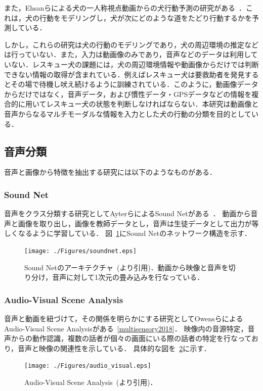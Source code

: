 また，Ehsanらによる犬の一人称視点動画からの犬行動予測の研究がある~\cite{whoretthedog}．これは，犬の行動をモデリングし，犬が次にどのような道をたどり行動するかを予測している．

しかし，これらの研究は犬の行動のモデリングであり，犬の周辺環境の推定などは行っていない．また，入力は動画像のみであり，音声などのデータは利用していない．レスキュー犬の課題には，犬の周辺環境情報や動画像からだけでは判断できない情報の取得が含まれている．例えばレスキュー犬は要救助者を発見するとその場で待機し吠え続けるように訓練されている．このように，動画像データからだけではなく，音声データ，および慣性データ・GPSデータなどの情報を複合的に用いてレスキュー犬の状態を判断しなければならない．本研究は動画像と音声からなるマルチモーダルな情報を入力とした犬の行動の分類を目的としている． 


\subsection{音声分類}
音声と画像から特徴を抽出する研究には以下のようなものがある．
\subsubsection{Sound Net}
音声をクラス分類する研究としてAyterらによるSound Netがある~\cite{aytar2016soundnet}．
動画から音声と画像を取り出し，画像を教師データとし，音声は生徒データとして出力が等しくなるように学習している．
図~\ref{soundnet_network}にSound Netのネットワーク構造を示す．
\begin{figure}[htbp]
 \begin{center}
  \texttt{[image: ./Figures/soundnet.eps]}
  \caption{Sound Netのアーキテクチャ~(\cite{aytar2016soundnet}より引用)．動画から映像と音声を切り分け，音声に対して1次元の畳み込みを行なっている．}
  \label{soundnet_network}
 \end{center}
\end{figure}

\subsubsection{Audio-Visual Scene Analysis}
音声と動画を紐づけて，その関係を明らかにする研究としてOwensらによるAudio-Visual Scene Analysisがある~\ref{multisensory2018}．
映像内の音源特定，音声からの動作認識，複数の話者が個々の画面にいる際の話者の特定を行なっており，音声と映像の関連性を示している．
具体的な図を~\ref{audio_visual}に示す．
\begin{figure}[htbp]
 \begin{center}
  \texttt{[image: ./Figures/audio\_visual.eps]}
  \caption{Audio-Visual Scene Analysis~(\cite{multisecsory2018}より引用)．}
  \label{audio_visual}
 \end{center}
\end{figure}
